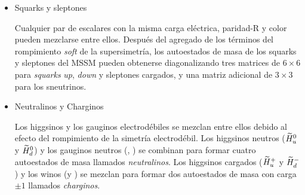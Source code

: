 \begin{itemize}\itemsep0.2cm\parskip0.2cm

\item Squarks y sleptones

  Cualquier par de escalares con la misma carga eléctrica, paridad-R y color
  pueden mezclarse entre ellos. Después del agregado de los términos del
  rompimiento \emph{soft} de la supersimetría, los autoestados de masa de los squarks y
  sleptones del MSSM pueden obtenerse diagonalizando tres matrices de $6\times6$
  para \emph{squarks} \emph{up}, \emph{down} y sleptones cargados, y una matriz adicional de $3\times 3$
  para los sneutrinos.





\item Neutralinos y Charginos

Los higgsinos y los gauginos electrodébiles se mezclan entre ellos debido al
efecto del rompimiento de la simetría electrodébil. Los higgsinos neutros
($\widetilde{H}_u^0$ y $\widetilde{H}_d^0$) y los gauginos neutros (\bino, \winozero) se
combinan para formar cuatro autoestados de masa llamados \emph{neutralinos}.
Los higgsinos cargados ($\widetilde{H}_u^+$ y $\widetilde{H}_d^-$) y los winos (\winop y
\winom) se mezclan para formar dos autoestados de masa con carga $\pm 1$
llamados \emph{charginos}.


\end{itemize}
